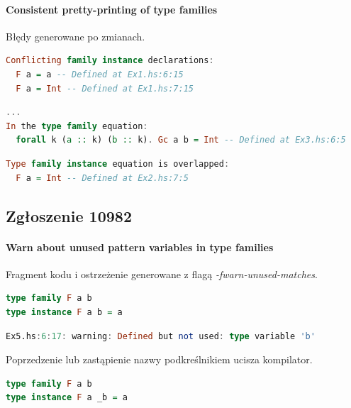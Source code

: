 \documentclass[polish]{beamer}
\makeatletter
\newcommand*{\currentname}{\@currentlabelname}
\makeatother
\begin{document}
\begin{frame}[t,fragile]{\currentname}
\framesubtitle{Consistent pretty-printing of type families}
Błędy generowane po zmianach.
\begin{block}{}
\begin{lstlisting}[language=Haskell,basicstyle=\tiny\ttfamily]
Conflicting family instance declarations:
  F a = a -- Defined at Ex1.hs:6:15
  F a = Int -- Defined at Ex1.hs:7:15
\end{lstlisting}
\end{block}
\begin{block}{}
\begin{lstlisting}[language=Haskell,basicstyle=\tiny\ttfamily]
...
In the type family equation:
  forall k (a :: k) (b :: k). Gc a b = Int -- Defined at Ex3.hs:6:5
\end{lstlisting}
\end{block}
\begin{block}{}
\begin{lstlisting}[language=Haskell,basicstyle=\tiny\ttfamily]
Type family instance equation is overlapped:
  F a = Int -- Defined at Ex2.hs:7:5
\end{lstlisting}
\end{block}
\end{frame}


\subsection{Zgłoszenie 10982} %
\begin{frame}[t,fragile]{\currentname}
    \framesubtitle{Warn about unused pattern variables in type families}
\small

Fragment kodu i ostrzeżenie generowane z flagą \emph{-fwarn-unused-matches}.
\begin{block}{}
\begin{lstlisting}[language=Haskell,basicstyle=\tiny\ttfamily]
type family F a b
type instance F a b = a
\end{lstlisting}
\end{block}

\begin{block}{}
\begin{lstlisting}[language=Haskell,basicstyle=\tiny\ttfamily]
Ex5.hs:6:17: warning: Defined but not used: type variable 'b'
\end{lstlisting}
\end{block}

Poprzedzenie lub zastąpienie nazwy podkreślnikiem ucisza kompilator.
\begin{block}{}
\begin{lstlisting}[language=Haskell,basicstyle=\tiny\ttfamily]
type family F a b
type instance F a _b = a
\end{lstlisting}
\end{block}
\end{frame}
\end{document}
